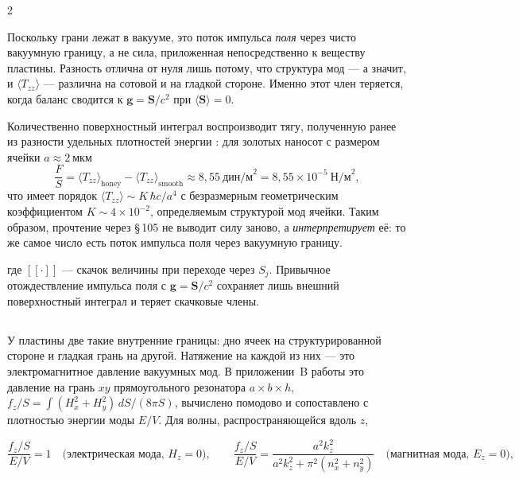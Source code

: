 \documentclass[twoside, 10pt]{article}
\def\myvspacebeforesubsection{-2.0mm}
\def\myvspaceaftersubsection{-2.5mm}
\begin{document}
\begin{multicols}{2}

Поскольку грани лежат в вакууме, это поток импульса \emph{поля} через
чисто вакуумную границу, а не сила, приложенная непосредственно к веществу
пластины. Разность отлична от нуля лишь потому, что структура мод —
а значит, и $\langle T_{zz}\rangle$ — различна на сотовой и на
гладкой стороне. Именно этот член теряется, когда баланс сводится
к $\mathbf{g}=\mathbf{S}/c^2$ при $\langle\mathbf{S}\rangle=0$.

Количественно поверхностный интеграл воспроизводит тягу, полученную ранее из
разности удельных плотностей энергии \cite{Drozdov2024}: для золотых
наносот с размером ячейки $a\approx 2~$мкм
\[
\frac{F}{S} = \langle T_{zz}\rangle_{\mathrm{honey}} - \langle T_{zz}\rangle_{\mathrm{smooth}}
\approx 8{,}55~\text{дин/м}^2 = 8{,}55\times10^{-5}~\text{Н/м}^2 ,
\]
что имеет порядок $\langle T_{zz}\rangle \sim K\,\hbar c/a^4$ с безразмерным
геометрическим коэффициентом $K\sim 4\times10^{-2}$, определяемым структурой мод ячейки.
Таким образом, прочтение через \S\,105 не выводит силу заново, а \emph{интерпретирует} её:
то же самое число есть поток импульса поля через вакуумную границу.

где $[\![\cdot]\!]$ --- скачок величины при переходе через $S_j$. Привычное
отождествление импульса поля с $\mathbf{g}=\mathbf{S}/c^2$ сохраняет лишь внешний
поверхностный интеграл и теряет скачковые члены.

\vspace{\myvspacebeforesubsection}
\subsection*{}
\vspace{\myvspaceaftersubsection}

У пластины две такие внутренние границы: дно ячеек на структурированной стороне и
гладкая грань на другой. Натяжение на каждой из них --- это электромагнитное давление
вакуумных мод. В приложении~B работы \cite{Drozdov2024} это давление на грань $xy$
прямоугольного резонатора $a\times b\times h$, $f_z/S=\int(H_x^2+H_y^2)\,dS/(8\pi S)$,
вычислено помодово и сопоставлено с плотностью энергии моды $E/V$. Для волны,
распространяющейся вдоль $z$,
\end{multicols}
\[
\frac{f_z/S}{E/V}=1 \quad\text{(электрическая мода, } H_z=0\text{)},
\qquad
\frac{f_z/S}{E/V}=\frac{a^2k_z^2}{a^2k_z^2+\pi^2(n_x^2+n_y^2)} \quad\text{(магнитная мода, } E_z=0\text{)},
\]
\end{document}
